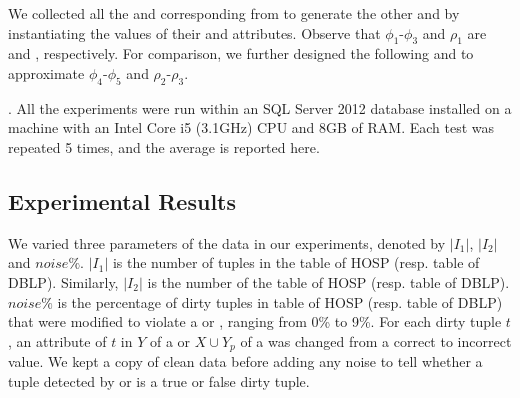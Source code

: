We collected all the  and corresponding  from \dblp to generate the other \pCFDs and \pCINDs by instantiating the values of their  and  attributes. Observe that $\phi_1$-$\phi_3$ and $\rho _1$ are \CFDs and \CINDs, respectively. For comparison,  we further designed the following \CFDs and \CINDs to approximate $\phi_4$-$\phi_5$ and $\rho_2$-$\rho_3$.

\begin{footnotesize}
\end{footnotesize}


. All the experiments were run within an SQL Server 2012 database installed on a machine with an Intel Core i5 (3.1GHz) CPU and 8GB of RAM. Each test was repeated 5 times, and the average is reported here.

\subsection{Experimental Results}
We varied three parameters of the data in our experiments, denoted by $|I_1|$, $|I_2|$ and $noise\%$. $|I_1|$ is the number of tuples in the table  of HOSP (resp. table  of DBLP). Similarly, $|I_2|$ is the number of the table  of HOSP (resp. table  of DBLP). $noise\%$ is the percentage of dirty tuples in table  of HOSP (resp. table  of DBLP) that were modified to violate a \pCFD or \pCIND, ranging from 0\% to 9\%. For each dirty tuple $t$, an attribute of $t$ in $Y$ of a \pCFD or $X \cup Y_p$ of a \pCIND was changed from a correct to incorrect value. We kept a copy of clean data before adding any noise to tell whether a tuple detected by \pCFDs or \pCINDs is a true or false dirty tuple.

